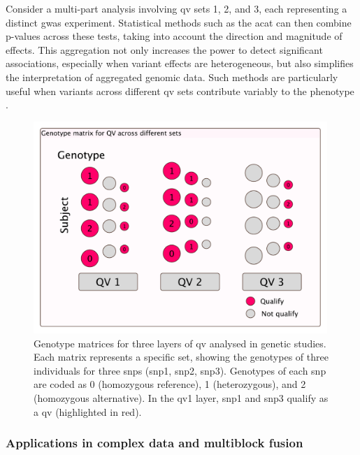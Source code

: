 Consider a multi-part analysis involving \ac{qv} sets 1, 2, and 3, each representing a distinct \ac{gwas} experiment. Statistical methods such as the \ac{acat} \cite{liu2019acat, li2020dynamic} can then combine p-values across these tests, taking into account the direction and magnitude of effects. This aggregation not only increases the power to detect significant associations, especially when variant effects are heterogeneous, but also simplifies the interpretation of aggregated genomic data. Such methods are particularly useful when variants across different \ac{qv} sets contribute variably to the phenotype \cite{Lawless2025Archipelago}.

\begin{figure}[h]
    \centering
   \includegraphics[width=0.99\textwidth]{./images/qv_matrix.pdf}
    \caption{Genotype matrices for three layers of \ac{qv} analysed in genetic studies. Each matrix represents a specific set, showing the genotypes of three individuals for three \ac{snp}s (\ac{snp}1, \ac{snp}2, \ac{snp}3). 
Genotypes of each \ac{snp} are coded as 0 (homozygous reference), 1 (heterozygous), and 2 (homozygous alternative).    
    In the \ac{qv}1 layer, \ac{snp}1 and \ac{snp}3 qualify as a \ac{qv} (highlighted in red). }
    \label{fig:qv_matrix}
\end{figure}

\subsubsection{Applications in complex data and multiblock fusion} 

